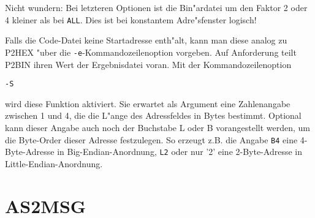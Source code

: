 \documentclass[12pt,a4paper,twoside]{report}
\newcommand{\tty}[1]{{\tt #1}}
\begin{document}
Nicht wundern: Bei letzteren Optionen ist die Bin"ardatei um den Faktor 2
oder 4 kleiner als bei \tty{ALL}.  Dies ist bei konstantem Adre"sfenster logisch!

Falls die Code-Datei keine Startadresse enth"alt, kann man diese
analog zu P2HEX "uber die \tty{-e}-Kommandozeilenoption vorgeben.  Auf
Anforderung teilt P2BIN ihren Wert der Ergebnisdatei voran.  Mit der
Kommandozeilenoption
\begin{verbatim}
-S
\end{verbatim}
wird diese Funktion aktiviert.  Sie erwartet als Argument eine
Zahlenangabe zwischen 1 und 4,  die die L"ange des Adressfeldes in
Bytes bestimmt.  Optional kann dieser Angabe auch noch der Buchstabe
L oder B vorangestellt werden, um die Byte-Order dieser Adresse
festzulegen.  So erzeugt z.B. die Angabe \tty{B4} eine 4-Byte-Adresse in
Big-Endian-Anordnung, \tty{L2} oder nur '2' eine 2-Byte-Adresse in
Little-Endian-Anordnung.


\section{AS2MSG}
\end{document}
